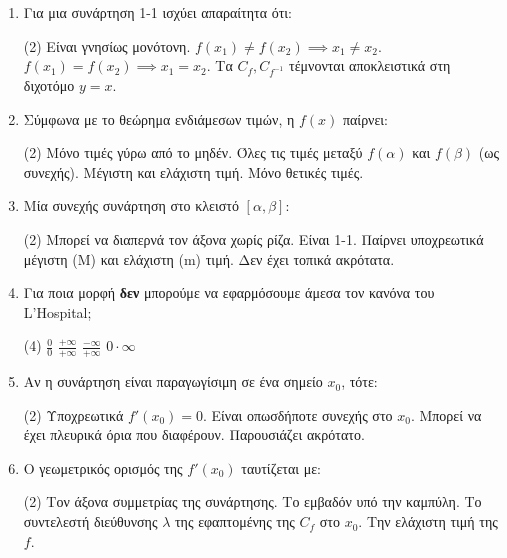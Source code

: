 \documentclass[11pt,a4paper]{article}
\renewcommand{\textdexiakeraia}{}
\begin{document}
\begin{enumerate}[label=\textbf{\arabic*.}, itemsep=4mm]
    \item Για μια συνάρτηση 1-1 ισχύει απαραίτητα ότι:
    \begin{tasks}[label=\let\textdexiakeraia\relax\alph*.](2)
        \task Είναι γνησίως μονότονη.
        \task $f(x_1) \ne f(x_2) \implies x_1 \ne x_2$.
        \task $f(x_1) = f(x_2) \implies x_1 = x_2$.
        \task Tα $C_f, C_{f^{-1}}$ τέμνονται αποκλειστικά στη διχοτόμο $y=x$.
    \end{tasks}

    \item Σύμφωνα με το θεώρημα ενδιάμεσων τιμών, η $f(x)$ παίρνει:
    \begin{tasks}[label=\let\textdexiakeraia\relax\alph*.](2)
        \task Μόνο τιμές γύρω από το μηδέν.
        \task Όλες τις τιμές μεταξύ $f(\alpha)$ και $f(\beta)$ (ως συνεχής).
        \task Μέγιστη και ελάχιστη τιμή.
        \task Μόνο θετικές τιμές.
    \end{tasks}

    \item Μία συνεχής συνάρτηση στο κλειστό $[\alpha, \beta]$:
    \begin{tasks}[label=\let\textdexiakeraia\relax\alph*.](2)
        \task Μπορεί να διαπερνά τον άξονα χωρίς ρίζα.
        \task Είναι 1-1.
        \task Παίρνει υποχρεωτικά μέγιστη (Μ) και ελάχιστη (m) τιμή.
        \task Δεν έχει τοπικά ακρότατα.
    \end{tasks}

    \item Για ποια μορφή \textbf{δεν} μπορούμε να εφαρμόσουμε άμεσα τον κανόνα του L'Hospital;
    \begin{tasks}[label=\let\textdexiakeraia\relax\alph*.](4)
        \task $\frac{0}{0}$
        \task $\frac{+\infty}{+\infty}$
        \task $\frac{-\infty}{+\infty}$
        \task $0 \cdot \infty$
    \end{tasks}

    \item Αν η συνάρτηση είναι παραγωγίσιμη σε ένα σημείο $x_0$, τότε:
    \begin{tasks}[label=\let\textdexiakeraia\relax\alph*.](2)
        \task Υποχρεωτικά $f'(x_0) = 0$.
        \task Είναι οπωσδήποτε συνεχής στο $x_0$.
        \task Μπορεί να έχει πλευρικά όρια που διαφέρουν.
        \task Παρουσιάζει ακρότατο.
    \end{tasks}

    \item Ο γεωμετρικός ορισμός της $f'(x_0)$ ταυτίζεται με:
    \begin{tasks}[label=\let\textdexiakeraia\relax\alph*.](2)
        \task Τον άξονα συμμετρίας της συνάρτησης.
        \task Το εμβαδόν υπό την καμπύλη.
        \task Το συντελεστή διεύθυνσης $\lambda$ της εφαπτομένης της $C_f$ στο $x_0$.
        \task Την ελάχιστη τιμή της $f$.
    \end{tasks}


\end{enumerate}
\end{document}
